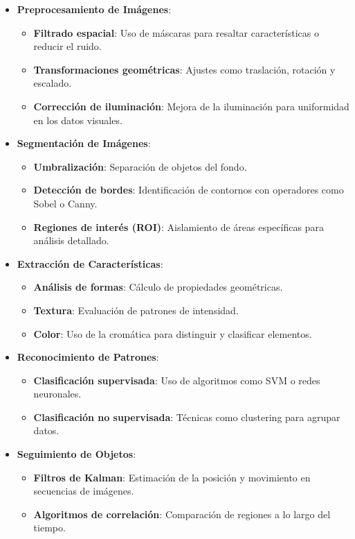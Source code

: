 \begin{itemize}
    \item \textbf{Preprocesamiento de Imágenes}:
    \begin{itemize}
        \item \textbf{Filtrado espacial}: Uso de máscaras para resaltar características o reducir el ruido.
        \item \textbf{Transformaciones geométricas}: Ajustes como traslación, rotación y escalado.
        \item \textbf{Corrección de iluminación}: Mejora de la iluminación para uniformidad en los datos visuales.
    \end{itemize}

    \item \textbf{Segmentación de Imágenes}:
    \begin{itemize}
        \item \textbf{Umbralización}: Separación de objetos del fondo.
        \item \textbf{Detección de bordes}: Identificación de contornos con operadores como Sobel o Canny.
        \item \textbf{Regiones de interés (ROI)}: Aislamiento de áreas específicas para análisis detallado.
    \end{itemize}

    \item \textbf{Extracción de Características}:
    \begin{itemize}
        \item \textbf{Análisis de formas}: Cálculo de propiedades geométricas.
        \item \textbf{Textura}: Evaluación de patrones de intensidad.
        \item \textbf{Color}: Uso de la cromática para distinguir y clasificar elementos.
    \end{itemize}

    \item \textbf{Reconocimiento de Patrones}:
    \begin{itemize}
        \item \textbf{Clasificación supervisada}: Uso de algoritmos como SVM o redes neuronales.
        \item \textbf{Clasificación no supervisada}: Técnicas como clustering para agrupar datos.
    \end{itemize}

    \item \textbf{Seguimiento de Objetos}:
    \begin{itemize}
        \item \textbf{Filtros de Kalman}: Estimación de la posición y movimiento en secuencias de imágenes.
        \item \textbf{Algoritmos de correlación}: Comparación de regiones a lo largo del tiempo.
    \end{itemize}
\end{itemize}

